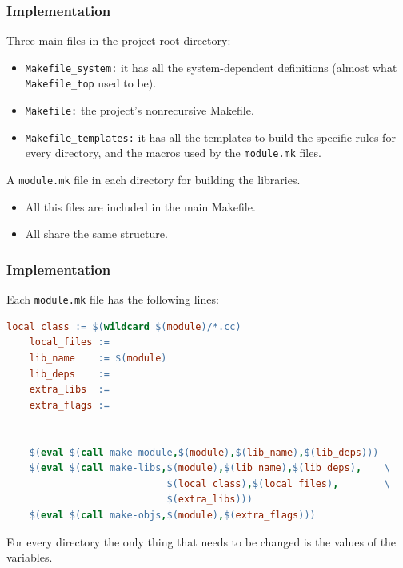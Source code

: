 \documentclass[11pt]{beamer}
\begin{document}

\begin{frame}
  \frametitle{Implementation}
  Three main files in the project root directory:

  \begin{itemize}
    \item \texttt{Makefile\_system:} it has all the system-dependent
      definitions (almost what \texttt{Makefile\_top} used to be).\\[2mm]
    \item \texttt{Makefile:} the project's nonrecursive Makefile.\\[2mm]
    \item \texttt{Makefile\_templates:} it has all the templates to build the
      specific rules for every directory, and the macros used by the
      \texttt{module.mk} files. 
  \end{itemize}

  \vspace{3mm}
  A \texttt{module.mk} file in each directory for building the libraries.

  \begin{itemize}
    \item All this files are included in the main Makefile.\\[2mm]
    \item All share the same structure.
  \end{itemize}
\end{frame}


\lstset{%
     showstringspaces = false,
     basicstyle=\scriptsize\ttfamily,
   }

\begin{frame}[fragile]
  \frametitle{Implementation}
  Each \texttt{module.mk} file has the following lines:

  \begin{lstlisting}[language=make]
    local_class := $(wildcard $(module)/*.cc)
    local_files :=
    lib_name    := $(module)
    lib_deps    :=
    extra_libs  :=
    extra_flags :=


    $(eval $(call make-module,$(module),$(lib_name),$(lib_deps)))
    $(eval $(call make-libs,$(module),$(lib_name),$(lib_deps),    \
                            $(local_class),$(local_files),        \
                            $(extra_libs)))
    $(eval $(call make-objs,$(module),$(extra_flags)))
  \end{lstlisting}

  \pause
  For every directory the only thing that needs to be changed is the values of
  the variables.
\end{frame}
\end{document}
